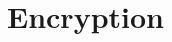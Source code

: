 \documentclass[lnicst,sechang,a4paper]{svmultln}
\begin{document}

\section{Encryption}
\label{sec:encryption}
\end{document}
